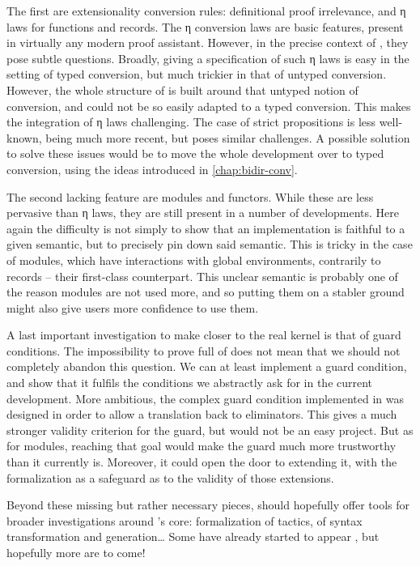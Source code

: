 The first are extensionality conversion rules: definitional proof irrelevance,
and η laws for functions and records.
The η conversion laws are basic features, present in virtually
any modern proof assistant. However,
in the precise context of , they pose subtle questions.%
%
Broadly, giving a specification of such η laws is easy in the setting of typed conversion, but
much trickier in that of untyped conversion. However, the whole structure of  is built
around that untyped notion of conversion, and could not be so easily adapted to a typed
conversion. This makes the integration of η laws challenging. The case of strict propositions is
less well-known, being much more recent, but poses similar challenges.
A possible solution to solve these issues would be to move the whole development over to typed conversion,
using the ideas introduced in \cref{chap:bidir-conv}.

The second lacking feature are modules and functors.
While these are less pervasive than η laws, they are still present in a number of developments.
Here again the difficulty is not simply to show that an implementation is faithful to a given
semantic, but to precisely pin down said semantic. This is tricky in the case of modules, which
have interactions with global environments, contrarily to records – their first-class counterpart.
This unclear semantic is probably one of the reason modules are not used more, and so putting
them on a stabler ground might also give users more confidence to use them.

A last important investigation to make  closer to the real kernel is that of
guard conditions. The impossibility to prove full  of 
does not mean that we should not completely abandon this question. We
can at least implement a guard condition,
and show that it fulfils the conditions we abstractly ask for
in the current development. More ambitious, the complex guard condition implemented in 
was designed  in order to allow a translation back to eliminators.
This gives a much stronger validity criterion for the guard, but would not be an easy project.
But as for modules, reaching
that goal would make the guard much more trustworthy than it currently is. Moreover,
it could open the door to extending it, with the formalization
as a safeguard as to the validity of those extensions.

Beyond these missing but rather necessary pieces,
 should hopefully offer tools for
broader investigations around ’s core: formalization of tactics,
of syntax transformation and generation… Some have already started to appear
, but hopefully more are to come!

